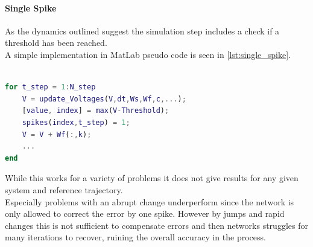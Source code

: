 \paragraph{Single Spike}
As the dynamics outlined suggest the simulation step includes a check if a threshold has been reached. \\
A simple implementation in MatLab pseudo code is seen in \cref{lst:single_spike}.

\begin{lstlisting}[language=Matlab, caption=Single spike implementation,label=lst:single_spike]

for t_step = 1:N_step
	V = update_Voltages(V,dt,Ws,Wf,c,...);
	[value, index] = max(V-Threshold);
	spikes(index,t_step) = 1;
	V = V + Wf(:,k);
	...
end
\end{lstlisting}
While this works for a variety of problems it does not give results for any given system and reference trajectory.\\
Especially problems with an abrupt change underperform since the network is only allowed to correct the error by one spike. However by jumps and rapid changes this is not sufficient to compensate errors and then networks struggles for many iterations to recover, ruining the overall accuracy in the process.
